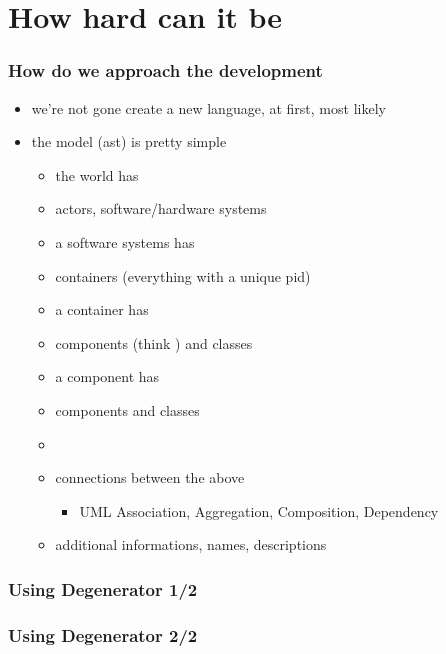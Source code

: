 \documentclass[xelatex,13pt]{beamer}
\begin{document}
\section{How hard can it be}
\begin{frame}
	\frametitle{How do we approach the development}
	\begin{itemize}
		\item we're not gone create a new language\pause, at first\pause,
			most likely
		\item the model (ast) is pretty simple
			\pause
		\begin{itemize}
			\item the world has
			\item actors, software/hardware systems
			\item a software systems has
			\item containers (everything with a unique pid)
			\item a container has
			\item components (think \lstinline@module@) and classes
			\item a component has
			\item components and classes
			\item[]
			\item connections between the above
			\begin{itemize}
				\item UML Association, Aggregation, Composition, Dependency
			\end{itemize}
			\item additional informations, names, descriptions
		\end{itemize}
	\end{itemize}
\end{frame}

\begin{frame}
	\frametitle{Using Degenerator 1/2}
	
	\pause
	
	\pause
	
	\pause
	
\end{frame}

\begin{frame}
	\frametitle{Using Degenerator 2/2}
	
	\pause
	
	\pause
	
\end{frame}
\end{document}
